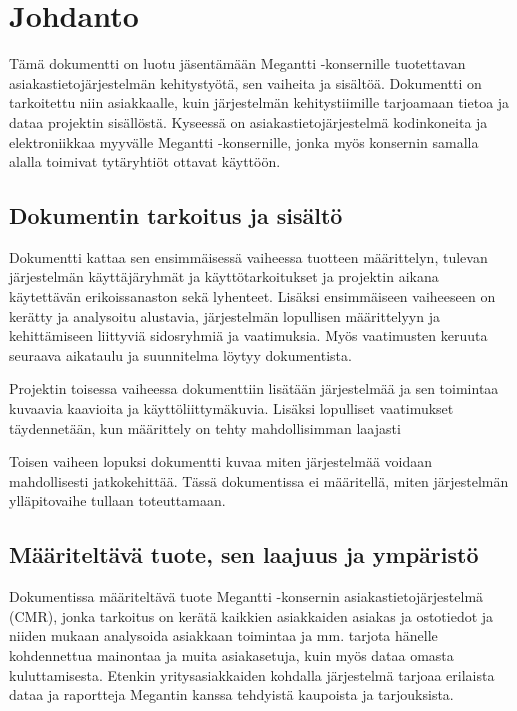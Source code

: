 \chapter{Johdanto} %
\label{johdanto} %
\thispagestyle{fancy} %


Tämä dokumentti on luotu jäsentämään Megantti -konsernille tuotettavan asiakastietojärjestelmän kehitystyötä, sen vaiheita ja 
sisältöä. Dokumentti on tarkoitettu niin asiakkaalle, kuin järjestelmän kehitystiimille tarjoamaan tietoa ja dataa projektin
sisällöstä. Kyseessä on asiakastietojärjestelmä kodinkoneita ja elektroniikkaa myyvälle Megantti -konsernille, jonka myös 
konsernin samalla alalla toimivat tytäryhtiöt ottavat käyttöön. 

\section{Dokumentin tarkoitus ja sisältö} %

    Dokumentti kattaa sen ensimmäisessä vaiheessa tuotteen määrittelyn, tulevan järjestelmän käyttäjäryhmät ja käyttötarkoitukset
    ja projektin aikana käytettävän erikoissanaston sekä lyhenteet. Lisäksi ensimmäiseen vaiheeseen on kerätty ja analysoitu alustavia,
    järjestelmän lopullisen määrittelyyn ja kehittämiseen liittyviä sidosryhmiä ja vaatimuksia. Myös vaatimusten keruuta seuraava
    aikataulu ja suunnitelma löytyy dokumentista.

    Projektin toisessa vaiheessa dokumenttiin lisätään järjestelmää ja sen toimintaa kuvaavia kaavioita ja käyttöliittymäkuvia. 
    Lisäksi lopulliset vaatimukset täyden\-netään, kun määrittely on tehty mahdollisimman laajasti

    Toisen vaiheen lopuksi dokumentti kuvaa miten järjestelmää voidaan mahdollisesti jatkokehittää.
    Tässä dokumentissa ei määritellä, miten järjestelmän ylläpitovaihe tullaan toteuttamaan.


\section{Määriteltävä tuote, sen laajuus ja ympäristö}

    Dokumentissa määriteltävä tuote Megantti -konsernin asiakastietojärjestelmä (CMR), jonka tarkoitus on kerätä kaikkien asiakkaiden asiakas
    ja ostotiedot ja niiden mukaan analysoida asiakkaan toimintaa ja mm. tarjota hänelle kohdennettua mainontaa ja muita asiakasetuja, 
    kuin myös dataa omasta kuluttamisesta. Etenkin yritysasiakkaiden kohdalla järjestelmä tarjoaa erilaista dataa ja raportteja Megantin 
    kanssa tehdyistä kaupoista ja tarjouksista. 

